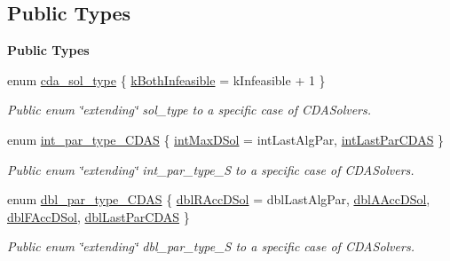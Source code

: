 \subsection*{Public Types}
\begin{Indent}\textbf{ Public Types}\par
\begin{DoxyCompactItemize}
\item 
enum \mbox{\hyperlink{class_s_m_spp__di__unipi__it_1_1_c_d_a_solver_a5c019517747a79f60866b19ce82194bf}{cda\+\_\+sol\+\_\+type}} \{ \mbox{\hyperlink{class_s_m_spp__di__unipi__it_1_1_c_d_a_solver_a5c019517747a79f60866b19ce82194bfadba3a97d48d409610a628464526ae573}{k\+Both\+Infeasible}} = k\+Infeasible + 1
 \}
\begin{DoxyCompactList}\small\item\em Public enum \char`\"{}extending\char`\"{} sol\+\_\+type to a specific case of C\+D\+A\+Solvers. \end{DoxyCompactList}\item 
enum \mbox{\hyperlink{class_s_m_spp__di__unipi__it_1_1_c_d_a_solver_a90159e630999d1355450db84f3aa5fa5}{int\+\_\+par\+\_\+type\+\_\+\+C\+D\+AS}} \{ \mbox{\hyperlink{class_s_m_spp__di__unipi__it_1_1_c_d_a_solver_a90159e630999d1355450db84f3aa5fa5a67fa7c1e611dbb82d9b3d283ad42fc8a}{int\+Max\+D\+Sol}} = int\+Last\+Alg\+Par, 
\mbox{\hyperlink{class_s_m_spp__di__unipi__it_1_1_c_d_a_solver_a90159e630999d1355450db84f3aa5fa5a766cfdd25e01890462e8d496b2126fbe}{int\+Last\+Par\+C\+D\+AS}}
 \}
\begin{DoxyCompactList}\small\item\em Public enum \char`\"{}extending\char`\"{} int\+\_\+par\+\_\+type\+\_\+S to a specific case of C\+D\+A\+Solvers. \end{DoxyCompactList}\item 
enum \mbox{\hyperlink{class_s_m_spp__di__unipi__it_1_1_c_d_a_solver_a12473d2c0cbab01587927c637e3f7e4b}{dbl\+\_\+par\+\_\+type\+\_\+\+C\+D\+AS}} \{ \mbox{\hyperlink{class_s_m_spp__di__unipi__it_1_1_c_d_a_solver_a12473d2c0cbab01587927c637e3f7e4baf904648a60949087c00b4c1a0f2a0fbb}{dbl\+R\+Acc\+D\+Sol}} = dbl\+Last\+Alg\+Par, 
\mbox{\hyperlink{class_s_m_spp__di__unipi__it_1_1_c_d_a_solver_a12473d2c0cbab01587927c637e3f7e4ba054bbc58a2d8652169db874942c1338d}{dbl\+A\+Acc\+D\+Sol}}, 
\mbox{\hyperlink{class_s_m_spp__di__unipi__it_1_1_c_d_a_solver_a12473d2c0cbab01587927c637e3f7e4ba80cb103dc992a8deaf4ffa1998b284fa}{dbl\+F\+Acc\+D\+Sol}}, 
\mbox{\hyperlink{class_s_m_spp__di__unipi__it_1_1_c_d_a_solver_a12473d2c0cbab01587927c637e3f7e4ba2558addd74555103399b7dbe2ae38b16}{dbl\+Last\+Par\+C\+D\+AS}}
 \}
\begin{DoxyCompactList}\small\item\em Public enum \char`\"{}extending\char`\"{} dbl\+\_\+par\+\_\+type\+\_\+S to a specific case of C\+D\+A\+Solvers. \end{DoxyCompactList}\end{DoxyCompactItemize}
\end{Indent}
